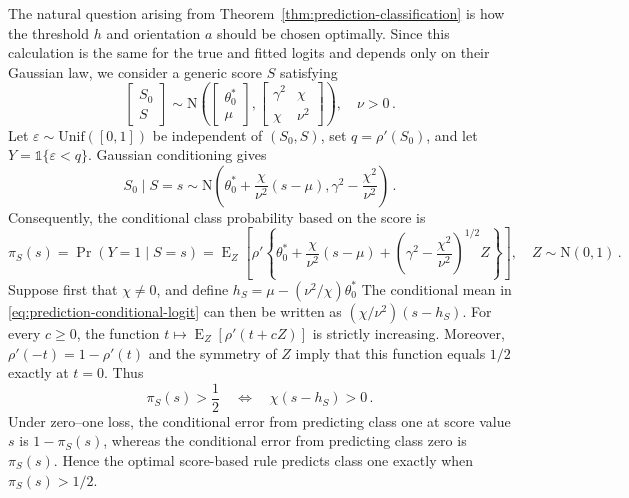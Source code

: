 \documentclass{article}
\DeclareMathOperator{\expect}{E}
\theoremstyle{definition}
\begin{document}
\begin{bibunit}
The natural question arising from
Theorem~\ref{thm:prediction-classification} is how the threshold $h$ and
orientation $a$ should be chosen optimally. Since this calculation is the same
for the true and fitted logits and depends only on their Gaussian law, we
consider a generic score $S$ satisfying
\begin{equation}
\label{eq:prediction-generic-parameters}
    \begin{bmatrix}
        S_0\\
        S
    \end{bmatrix}
    \sim
    \mathrm N\left(
        \begin{bmatrix}
            \theta_0^*\\
            \mu
        \end{bmatrix},
        \begin{bmatrix}
            \gamma^2 & \chi\\
            \chi & \nu^2
        \end{bmatrix}
    \right), 
    \quad
    \nu>0 \,.
\end{equation}
Let $\varepsilon\sim\mathrm{Unif}([0,1])$ be independent of $(S_0,S)$, set
$q=\rho'(S_0)$, and let $Y=\mathds{1}\{\varepsilon<q\}$. Gaussian
conditioning gives
\begin{equation}
\label{eq:prediction-conditional-logit}
    S_0\mid S=s
    \sim
    \mathrm N\left(
        \theta_0^*+\frac{\chi}{\nu^2}(s-\mu),
        \gamma^2-\frac{\chi^2}{\nu^2}
    \right) \,.
\end{equation}
Consequently, the conditional class probability based on the score is
\begin{equation}
\label{eq:prediction-calibration-map}
    \pi_S(s)
    =
    \Pr(Y=1\mid S=s)
    =
    \expect_Z\left[
        \rho'\left\{
            \theta_0^*
            +\frac{\chi}{\nu^2}(s-\mu)
            +\left(
                \gamma^2-\frac{\chi^2}{\nu^2}
            \right)^{1/2}Z
        \right\}
    \right],
    \quad
    Z\sim\mathrm N(0,1) \,.
\end{equation}
Suppose first that $\chi\neq0$, and define $ h_S
    =
    \mu-({\nu^2}/ {\chi})\theta_0^*$
The conditional mean in \eqref{eq:prediction-conditional-logit} can then be
written as
$
    ({\chi} / {\nu^2}) (s-h_S)
$. 
For every $c\geq0$, the function
$t\mapsto\expect_Z[\rho'(t+cZ)]$ is strictly increasing. Moreover,
$\rho'(-t)=1-\rho'(t)$ and the symmetry of $Z$ imply that this function
equals $1/2$ exactly at $t=0$. Thus
\begin{equation}
\label{eq:prediction-generic-level-set}
    \pi_S(s)>\frac12
    \quad\Longleftrightarrow\quad
    \chi(s-h_S)>0 \,.
\end{equation}
Under zero--one loss, the conditional error from predicting class one at
score value $s$ is $1-\pi_S(s)$, whereas the conditional error from
predicting class zero is $\pi_S(s)$. Hence the optimal score-based rule
predicts class one exactly when $\pi_S(s)>1/2$.


\end{bibunit}
\end{document}
